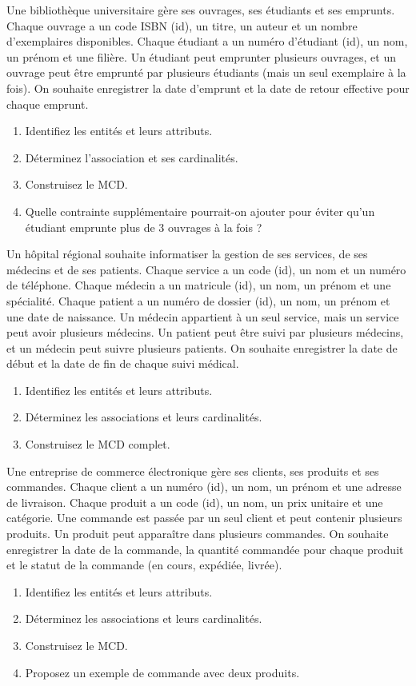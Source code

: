 \exo{}
Une bibliothèque universitaire gère ses ouvrages, ses étudiants et ses emprunts. Chaque ouvrage a un code ISBN (id), un titre, un auteur et un nombre d'exemplaires disponibles. Chaque étudiant a un numéro d'étudiant (id), un nom, un prénom et une filière. Un étudiant peut emprunter plusieurs ouvrages, et un ouvrage peut être emprunté par plusieurs étudiants (mais un seul exemplaire à la fois). On souhaite enregistrer la date d'emprunt et la date de retour effective pour chaque emprunt.
\begin{enumerate}
    \item Identifiez les entités et leurs attributs.
    \item Déterminez l'association et ses cardinalités.
    \item Construisez le MCD.
    \item Quelle contrainte supplémentaire pourrait-on ajouter pour éviter qu'un étudiant emprunte plus de 3 ouvrages à la fois ?
\end{enumerate}

\exo{}
Un hôpital régional souhaite informatiser la gestion de ses services, de ses médecins et de ses patients. Chaque service a un code (id), un nom et un numéro de téléphone. Chaque médecin a un matricule (id), un nom, un prénom et une spécialité. Chaque patient a un numéro de dossier (id), un nom, un prénom et une date de naissance. Un médecin appartient à un seul service, mais un service peut avoir plusieurs médecins. Un patient peut être suivi par plusieurs médecins, et un médecin peut suivre plusieurs patients. On souhaite enregistrer la date de début et la date de fin de chaque suivi médical.
\begin{enumerate}
    \item Identifiez les entités et leurs attributs.
    \item Déterminez les associations et leurs cardinalités.
    \item Construisez le MCD complet.
\end{enumerate}

\exo{}
Une entreprise de commerce électronique gère ses clients, ses produits et ses commandes. Chaque client a un numéro (id), un nom, un prénom et une adresse de livraison. Chaque produit a un code (id), un nom, un prix unitaire et une catégorie. Une commande est passée par un seul client et peut contenir plusieurs produits. Un produit peut apparaître dans plusieurs commandes. On souhaite enregistrer la date de la commande, la quantité commandée pour chaque produit et le statut de la commande (en cours, expédiée, livrée).
\begin{enumerate}
    \item Identifiez les entités et leurs attributs.
    \item Déterminez les associations et leurs cardinalités.
    \item Construisez le MCD.
    \item Proposez un exemple de commande avec deux produits.
\end{enumerate}

